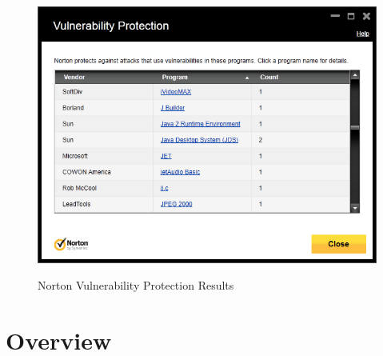 \begin{figure} \centering \includegraphics[width=0.8\linewidth]{norton-cve}
	\label{fig:nort} \caption{Norton Vulnerability Protection Results}
\end{figure}

\section{Overview}

